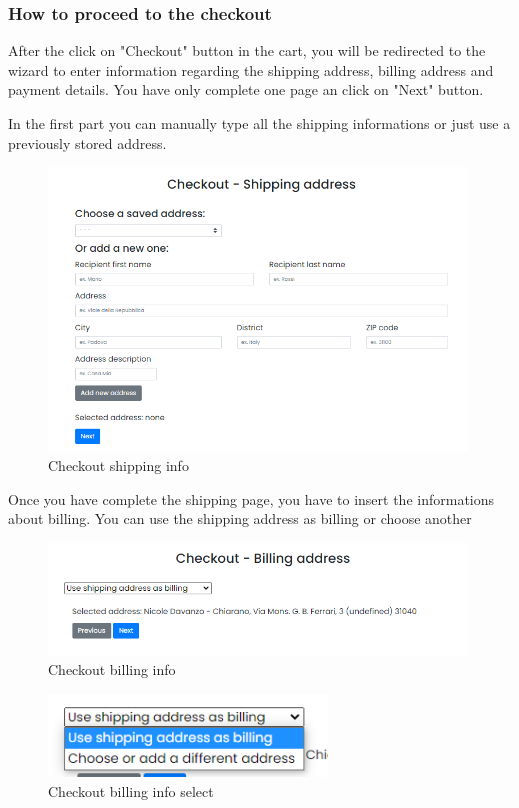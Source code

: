 \subsubsection{How to proceed to the checkout} \label{_checkout}
After the click on "Checkout" button in the cart, you will be redirected to the wizard to enter information regarding the shipping address, billing address and payment details.
You have only complete one page an click on "Next" button.

In the first part you can manually type all the shipping informations or just use a previously stored address.
\begin{figure}[H]
    \centering
    \includegraphics[width=30em]{res/images/cliente/checkoutshipping.png}
    \caption{Checkout shipping info}
\end{figure}
Once you have complete the shipping page, you have to insert the informations about billing.
You can use the shipping address as billing or choose another
\begin{figure}[H]
    \centering
    \includegraphics[width=30em]{res/images/cliente/checkoutbilling.png}
    \caption{Checkout billing info}
\end{figure}

\begin{figure}[H]
    \centering
    \includegraphics[width=20em]{res/images/cliente/billingbutton.png}
    \caption{Checkout billing info select}
\end{figure}


